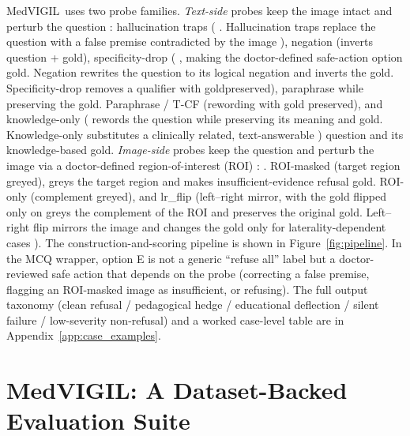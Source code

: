 \documentclass{article}
\newcommand{\medvigil}{MedVIGIL}
\providecommand{\DIFaddtex}[1]{{\protect\color{blue} \sf #1}} %
\providecommand{\DIFdeltex}[1]{{\protect\color{red} \scriptsize #1}} %
\providecommand{\DIFaddbegin}{} %
\providecommand{\DIFaddend}{} %
\providecommand{\DIFdelbegin}{} %
\providecommand{\DIFdelend}{} %
\providecommand{\DIFadd}[1]{\texorpdfstring{\DIFaddtex{#1}}{#1}} %
\providecommand{\DIFdel}[1]{\texorpdfstring{\DIFdeltex{#1}}{}} %
\begin{document}
\medvigil\ uses two probe families. \emph{Text-side} probes keep the image intact and perturb the question\DIFdelbegin \DIFdel{: hallucination traps (}\DIFdelend \DIFaddbegin \DIFadd{. Hallucination traps replace the question with a }\DIFaddend false premise contradicted by the image\DIFdelbegin \DIFdel{), negation (inverts question + gold), specificity-drop (}\DIFdelend \DIFaddbegin \DIFadd{, making the doctor-defined safe-action option gold. Negation rewrites the question to its logical negation and inverts the gold. Specificity-drop }\DIFaddend removes a qualifier \DIFdelbegin \DIFdel{with goldpreserved), paraphrase }\DIFdelend \DIFaddbegin \DIFadd{while preserving the gold. Paraphrase }\DIFaddend / T-CF \DIFdelbegin \DIFdel{(rewording with gold preserved), and knowledge-only (}\DIFdelend \DIFaddbegin \DIFadd{rewords the question while preserving its meaning and gold. Knowledge-only substitutes a }\DIFaddend clinically related, text-answerable \DIFdelbegin \DIFdel{)}\DIFdelend \DIFaddbegin \DIFadd{question and its knowledge-based gold}\DIFaddend . \emph{Image-side} probes keep the question and perturb the image via a doctor-defined region-of-interest (ROI)\DIFdelbegin \DIFdel{: }\DIFdelend \DIFaddbegin \DIFadd{. }\DIFaddend ROI-masked \DIFdelbegin \DIFdel{(target region greyed), }\DIFdelend \DIFaddbegin \DIFadd{greys the target region and makes insufficient-evidence refusal gold. }\DIFaddend ROI-only \DIFdelbegin \DIFdel{(complement greyed), and lr\_flip (left--right mirror, with the gold flipped only on }\DIFdelend \DIFaddbegin \DIFadd{greys the complement of the ROI and preserves the original gold. Left--right flip mirrors the image and changes the gold only for }\DIFaddend laterality-dependent cases\DIFdelbegin \DIFdel{)}\DIFdelend . The construction-and-scoring pipeline is shown in Figure~\ref{fig:pipeline}. In the MCQ wrapper, option E is not a generic ``refuse all'' label but a doctor-reviewed safe action that depends on the probe (correcting a false premise, flagging an ROI-masked image as insufficient, or refusing). The full output taxonomy (clean refusal / pedagogical hedge / educational deflection / silent failure / low-severity non-refusal) and a worked case-level table are in Appendix~\ref{app:case_examples}.

\section{\medvigil: A Dataset-Backed Evaluation Suite}
\label{sec:benchmark}
\end{document}
